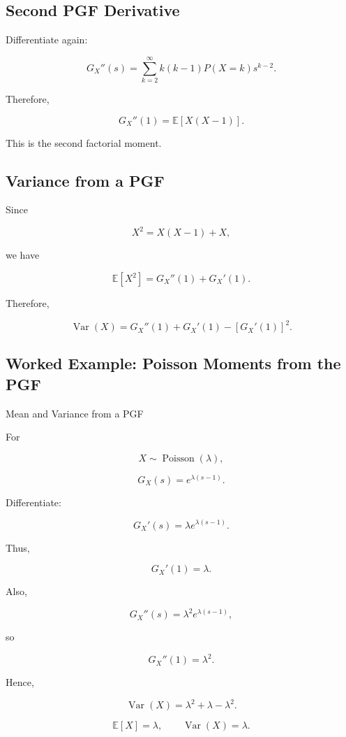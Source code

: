 \subsection{Second PGF Derivative}
\label{subsec:second-pgf-derivative}

Differentiate again:

\[
G_X''(s)
=
\sum_{k=2}^{\infty}
k(k-1)
P(X=k)
s^{k-2}.
\]

Therefore,

\[
\boxed{
G_X''(1)
=
\mathbb{E}[X(X-1)].
}
\]

This is the second factorial moment.

\subsection{Variance from a PGF}
\label{subsec:variance-from-pgf}

Since

\[
X^2
=
X(X-1)+X,
\]

we have

\[
\mathbb{E}[X^2]
=
G_X''(1)+G_X'(1).
\]

Therefore,

\[
\boxed{
\operatorname{Var}(X)
=
G_X''(1)
+
G_X'(1)
-
[G_X'(1)]^2.
}
\]

\subsection{Worked Example: Poisson Moments from the PGF}
\label{subsec:worked-poisson-pgf-moments}

\begin{workedexamplebox}{Mean and Variance from a PGF}

For

\[
X\sim\operatorname{Poisson}(\lambda),
\]

\[
G_X(s)
=
e^{\lambda(s-1)}.
\]

Differentiate:

\[
G_X'(s)
=
\lambda
e^{\lambda(s-1)}.
\]

Thus,

\[
G_X'(1)=\lambda.
\]

Also,

\[
G_X''(s)
=
\lambda^2
e^{\lambda(s-1)},
\]

so

\[
G_X''(1)=\lambda^2.
\]

Hence,

\[
\operatorname{Var}(X)
=
\lambda^2+\lambda-\lambda^2.
\]

\begin{answerbox}
\[
\boxed{
\mathbb{E}[X]
=
\lambda,
\qquad
\operatorname{Var}(X)
=
\lambda.
}
\]
\end{answerbox}

\end{workedexamplebox}

